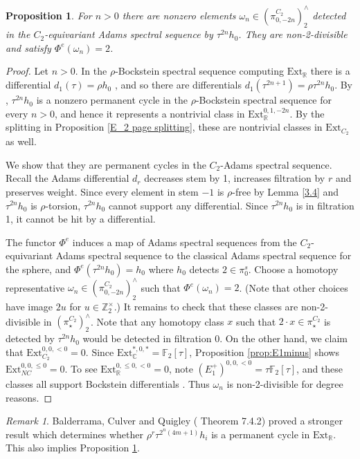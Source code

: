 \documentclass[psamsfonts]{amsart}
\newcommand{\C}{\mathbb C}
\newcommand{\F}{\mathbb F}
\newcommand{\Z}{\mathbb Z}
\newcommand{\Ext}{\mathrm {Ext}}
\newtheorem{proposition}[theorem]{Proposition}
\theoremstyle{definition}
\theoremstyle{remark}
\newtheorem{remark}[theorem]{Remark}
\newcommand{\R}{\mathbb{R}}
\numberwithin{equation}{section}
\begin{document}
\begin{proposition}\label{prop:main (a) positive coweight}
For $n > 0$ there are nonzero elements $\omega_n \in (\pi_{0,-2n}^{C_2})^\wedge_2$ detected in the $C_2$-equivariant Adams spectral sequence by $\tau^{2n}h_0$. They are non-2-divisible and satisfy $\Phi^e(\omega_n)=2$.
\end{proposition}
\begin{proof}
Let $n>0$.
In the $\rho$-Bockstein spectral sequence computing $\Ext_\R$ there is a differential  $d_1(\tau) = \rho h_0$ \cite[Proposition 3.2]{DI}, and so there are differentials $d_1(\tau^{2n+1}) = \rho \tau^{2n}h_0$. 
By \cite[Lemma 3.4]{DI}, $\tau^{2n}h_0$ is a nonzero permanent cycle in the $\rho$-Bockstein spectral sequence for every $n> 0$, and hence it represents a nontrivial class in $\Ext_\R^{0,1,-2n}$.
By the splitting in Proposition \ref{E_2 page splitting}, these are nontrivial classes in $\Ext_{C_2}$ as well.

We show that they are permanent cycles in the $C_2$-Adams spectral sequence.
Recall the Adams differential $d_r$ decreases stem by 1, increases filtration by $r$ and preserves weight. Since every element in stem $-1$ is $\rho$-free by Lemma \ref{3.4} and $\tau^{2n}h_0$ is $\rho$-torsion, $\tau^{2n}h_0$ cannot support any differential. Since $\tau^{2n}h_0$ is in filtration 1, it cannot be hit by a differential.

The functor $\Phi^e$ induces a map of Adams spectral sequences from the $C_2$-equivariant Adams spectral sequence to the classical Adams spectral sequence for the sphere, and $\Phi^e(\tau^{2n}h_0) = h_0$ where $h_0$ detects $2\in \pi_0^s$. Choose a homotopy representative $\omega_n\in(\pi_{0,-2n}^{C_2})^\wedge_2$ such that $\Phi^e(\omega_n)=2$. (Note that other choices have image $2u$ for $u\in \Z_2^\times$.)
It remains to check that these classes are non-2-divisible in
$(\pi_\star^{C_2})^\wedge_2$. Note that any homotopy class $x$ such that $2\cdot x\in\pi_\star^{C_2}$ is detected by $\tau^{2n}h_0$ would be detected in filtration 0. On the other hand, we claim that $\Ext_{C_2}^{0,0, <0}=0$. Since $\Ext_\C^{*,0,*} = \F_2[\tau]$, Proposition \ref{prop:E1minus} shows $\Ext_{NC}^{0,0,\leq 0}=0$. To see $\Ext_\R^{0,\leq0,<0}=0$, note $(E_1^+)^{0,0,<0}=\tau\F_2[\tau]$, and these classes all support Bockstein differentials \cite[Proposition 3.2]{DI}. Thus $\omega_n$ is non-2-divisible for degree reasons.
\end{proof}

\begin{remark}
Balderrama, Culver and Quigley (\cite{BCQ} Theorem 7.4.2) proved a stronger result which determines whether $\rho^r\tau^{2^n(4m+1)}h_i$ is a permanent cycle in $\Ext_\R$. This also implies Proposition \ref{prop:main (a) positive coweight}.
\end{remark} 
\end{document}
